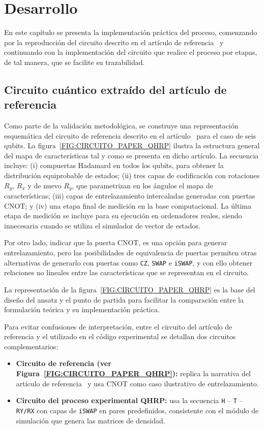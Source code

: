 \chapter{Desarrollo}
\label{cap:desarrollo}

En este capítulo se presenta la implementación práctica del proceso, comenzando por la reproducción del circuito descrito en el artículo de referencia~\cite{arian2025qhrp} y continuando con la implementación del circuito que realice el proceso por etapas, de tal manera, que se facilite su trazabilidad.

\section{Circuito cuántico extraído del artículo de referencia}
\label{sec:circuito_extraido_articulo}

Como parte de la validación metodológica, se construye una representación esquemática del circuito de referencia descrito en el artículo~\cite{arian2025qhrp} para el caso de seis qubits. La figura~\ref{FIG:CIRCUITO_PAPER_QHRP} ilustra la estructura general del mapa de características tal y como se presenta en dicho artículo. La secuencia incluye: (i) compuertas Hadamard en todos los qubits, para obtener la distribución equiprobable de estados; (ii) tres capas de codificación con rotaciones $R_y$, $R_x$ y de nuevo $R_y$, que parametrizan en los ángulos el mapa de características; (iii) capas de entrelazamiento intercaladas generadas con puertas CNOT; y (iv) una etapa final de medición en la base computacional. La última etapa de medición se incluye para su ejecución en ordenadores reales, siendo innecesaria cuando se utiliza el simulador de vector de estados.

Por otro lado, indicar que la puerta CNOT, es una opción para generar entrelazamiento, pero las posibilidades de equivalencia de puertas permiten otras alternativas de generarlo con puertas como \texttt{CZ}, \texttt{SWAP} e \texttt{iSWAP}, y con ello obtener relaciones no lineales entre las características que se representan en el circuito.

La representación de la figura~\ref{FIG:CIRCUITO_PAPER_QHRP} es la base del diseño del ansatz y el punto de partida para facilitar la comparación entre la formulación teórica y su implementación práctica.

Para evitar confusiones de interpretación, entre el circuito del artículo de referencia y el utilizado en el código experimental se detallan dos circuitos complementarios:
\begin{itemize}
\item \textbf{Circuito de referencia (ver Figura~\ref{FIG:CIRCUITO_PAPER_QHRP}):} replica la narrativa del artículo de referencia~\cite{arian2025qhrp} y usa CNOT como caso ilustrativo de entrelazamiento.
\item \textbf{Circuito del proceso experimental \gls{QHRP}:} usa la secuencia \texttt{H} -- \texttt{T} -- \texttt{RY/RX} con capas de \texttt{iSWAP} en pares predefinidos, consistente con el módulo de simulación que genera las matrices de densidad.
\end{itemize}

